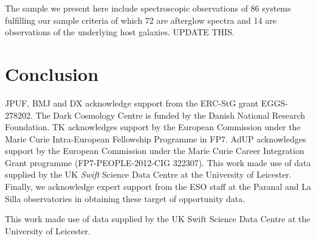 \documentclass{aa}    %
\begin{document}
The sample we present here include spectroscopic observations of 86 
systems fulfilling our sample criteria of which 72 are afterglow spectra 
and 14 are observations of the underlying host galaxies. 
UPDATE THIS.



\section{Conclusion}





\begin{acknowledgements}
JPUF, BMJ and DX acknowledge support from the ERC-StG grant EGGS-278202.  The
Dark Cosmology Centre is funded by the Danish National Research Foundation.  TK
acknowledges support by the European Commission under the Marie Curie
Intra-European Fellowship Programme in FP7.  AdUP acknowledges support by the
European Commission under the Marie Curie Career Integration Grant programme
(FP7-PEOPLE-2012-CIG 322307).  This work made use of data supplied by the UK
{\it Swift} Science Data Centre at the University of Leicester.  Finally, we
acknowledge expert support from the ESO staff at the Paranal and La Silla
observatories in obtaining these target of opportunity data.


This work made use of data supplied by the UK Swift Science Data Centre at the University of Leicester.
\end{acknowledgements}





\clearpage
\end{document}
